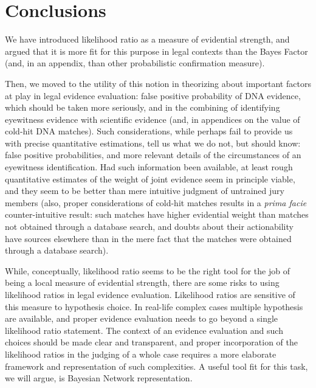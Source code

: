 \documentclass[
  10pt,
  dvipsnames,enabledeprecatedfontcommands]{scrartcl}
\newcommand{\mar}[1]{\todo[color=blue!40]{#1}}
\begin{document}
\section{Conclusions}

We have introduced likelihood ratio as a measure of evidential strength,
and argued that it is more fit for this purpose in legal contexts than
the Bayes Factor (and, in an appendix, than other probabilistic
confirmation measure).

Then, we moved to the utility of this notion in theorizing about
important factors at play in legal evidence evaluation: false positive
probability of DNA evidence, which should be taken more seriously, and
in the combining of identifying eyewitness evidence with scientific
evidence (and, in appendices on the value of cold-hit DNA matches). Such
considerations, while perhaps fail to provide us with precise
quantitative estimations, tell us what we do not, but should know: false
positive probabilities, and more relevant details of the circumstances
of an eyewitness identification. Had such information been available, at
least rough quantitative estimates of the weight of joint evidence seem
in principle viable, and they seem to be better than mere intuitive
judgment of untrained jury members (also, proper considerations of
cold-hit matches results in a \emph{prima facie} counter-intuitive
result: such matches have higher evidential weight than matches not
obtained through a database search, and doubts about their actionability
have sources elsewhere than in the mere fact that the matches were
obtained through a database search).

\mar{R: revised this in light of Sophie's comments.}

While, conceptually, likelihood ratio seems to be the right tool for the
job of being a local measure of evidential strength, there are some
risks to using likelihood ratios in legal evidence evaluation.
Likelihood ratios are sensitive of this measure to hypothesis choice. In
real-life complex cases multiple hypothesis are available, and proper
evidence evaluation needs to go beyond a single likelihood ratio
statement. The context of an evidence evaluation and such choices should
be made clear and transparent, and proper incorporation of the
likelihood ratios in the judging of a whole case requires a more
elaborate framework and representation of such complexities. A useful
tool fit for this task, we will argue, is Bayesian Network
representation.

\appendix
\end{document}
